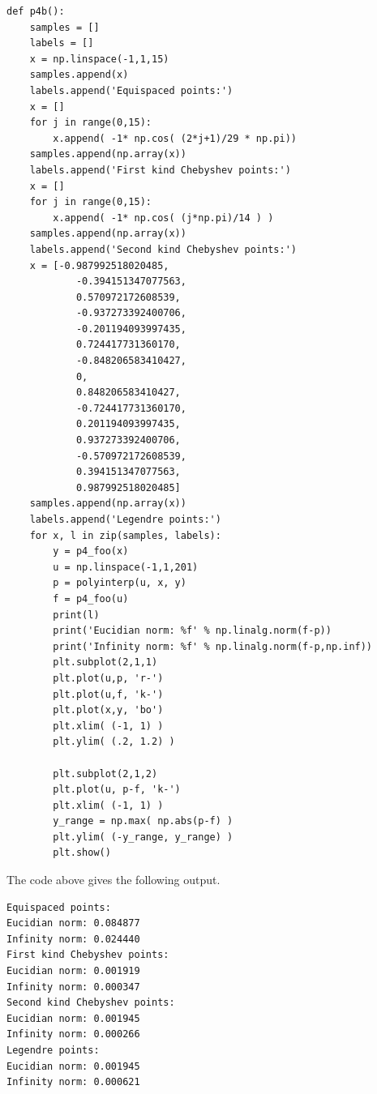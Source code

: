 \documentclass[12pt]{article}
\begin{document}
	\begin{lstlisting}
def p4b():
	samples = []
	labels = []
	x = np.linspace(-1,1,15)
	samples.append(x)
	labels.append('Equispaced points:')
	x = []
	for j in range(0,15):
		x.append( -1* np.cos( (2*j+1)/29 * np.pi))
	samples.append(np.array(x))
	labels.append('First kind Chebyshev points:')
	x = []
	for j in range(0,15):
		x.append( -1* np.cos( (j*np.pi)/14 ) )
	samples.append(np.array(x))
	labels.append('Second kind Chebyshev points:')
	x = [-0.987992518020485,
			-0.394151347077563,
			0.570972172608539,
			-0.937273392400706,
			-0.201194093997435,
			0.724417731360170,
			-0.848206583410427,
			0,
			0.848206583410427,
			-0.724417731360170,
			0.201194093997435,
			0.937273392400706,
			-0.570972172608539,
			0.394151347077563,
			0.987992518020485]
	samples.append(np.array(x))
	labels.append('Legendre points:')
	for x, l in zip(samples, labels):
		y = p4_foo(x)
		u = np.linspace(-1,1,201)
		p = polyinterp(u, x, y)
		f = p4_foo(u)
		print(l)
		print('Eucidian norm: %f' % np.linalg.norm(f-p))
		print('Infinity norm: %f' % np.linalg.norm(f-p,np.inf))
		plt.subplot(2,1,1)
		plt.plot(u,p, 'r-')
		plt.plot(u,f, 'k-')
		plt.plot(x,y, 'bo')
		plt.xlim( (-1, 1) )
		plt.ylim( (.2, 1.2) )
		
		plt.subplot(2,1,2)
		plt.plot(u, p-f, 'k-')
		plt.xlim( (-1, 1) )
		y_range = np.max( np.abs(p-f) )
		plt.ylim( (-y_range, y_range) )
		plt.show()
	\end{lstlisting}
	
	The code above gives the following output.
	\begin{lstlisting}
Equispaced points:
Eucidian norm: 0.084877
Infinity norm: 0.024440
First kind Chebyshev points:
Eucidian norm: 0.001919
Infinity norm: 0.000347
Second kind Chebyshev points:
Eucidian norm: 0.001945
Infinity norm: 0.000266
Legendre points:
Eucidian norm: 0.001945
Infinity norm: 0.000621
	\end{lstlisting}
	
\end{document}
